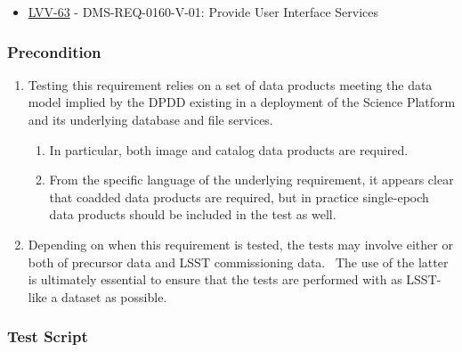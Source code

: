 \begin{itemize}
\tightlist
\item
  \href{https://jira.lsstcorp.org/browse/LVV-63}{LVV-63} -
  DMS-REQ-0160-V-01: Provide User Interface Services
\end{itemize}

\hypertarget{precondition-16}{%
\subsubsection{Precondition}\label{precondition-16}}

\begin{enumerate}
\tightlist
\item
  Testing this requirement relies on a set of data products meeting the
  data model implied by the DPDD existing in a deployment of the Science
  Platform and its underlying database and file services.

  \begin{enumerate}
  \tightlist
  \item
    In particular, both image and catalog data products are required.
  \item
    From the specific language of the underlying requirement, it appears
    clear that coadded data products are required, but in practice
    single-epoch data products should be included in the test as well.
  \end{enumerate}
\item
  Depending on when this requirement is tested, the tests may involve
  either or both of precursor data and LSST commissioning data. ~The use
  of the latter is ultimately essential to ensure that the tests are
  performed with as LSST-like a dataset as possible.
\end{enumerate}

\hypertarget{test-script-108}{%
\subsubsection{Test Script}\label{test-script-108}}

